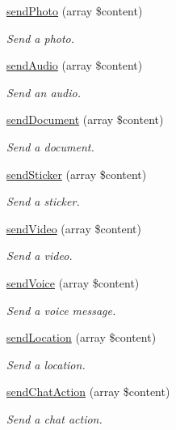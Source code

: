 \begin{DoxyCompactItemize}
\hyperlink{class_telegram_ac7adcbd9f46b77664f8b738b84f290e7}{send\+Photo} (array \$content)
\begin{DoxyCompactList}\small\item\em Send a photo. \end{DoxyCompactList}\item 
\hyperlink{class_telegram_a178b081bbab51f83caa31e554b3e2ffe}{send\+Audio} (array \$content)
\begin{DoxyCompactList}\small\item\em Send an audio. \end{DoxyCompactList}\item 
\hyperlink{class_telegram_a25569ca763bd149891d86b89bc66cf54}{send\+Document} (array \$content)
\begin{DoxyCompactList}\small\item\em Send a document. \end{DoxyCompactList}\item 
\hyperlink{class_telegram_a0a176d232d8e7941184698447902beb6}{send\+Sticker} (array \$content)
\begin{DoxyCompactList}\small\item\em Send a sticker. \end{DoxyCompactList}\item 
\hyperlink{class_telegram_a789f27ed21d8a1232cc60832efdab17f}{send\+Video} (array \$content)
\begin{DoxyCompactList}\small\item\em Send a video. \end{DoxyCompactList}\item 
\hyperlink{class_telegram_a4faab9f92639453b851912d41ca1a3ca}{send\+Voice} (array \$content)
\begin{DoxyCompactList}\small\item\em Send a voice message. \end{DoxyCompactList}\item 
\hyperlink{class_telegram_ac395e843f13d36d70f57c2d26868a33f}{send\+Location} (array \$content)
\begin{DoxyCompactList}\small\item\em Send a location. \end{DoxyCompactList}\item 
\hyperlink{class_telegram_aa8c4c54f8f2fcbb53de050458fb176b7}{send\+Chat\+Action} (array \$content)
\begin{DoxyCompactList}\small\item\em Send a chat action. \end{DoxyCompactList}\item 

\end{DoxyCompactItemize}
